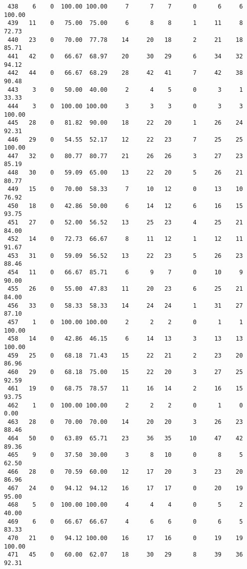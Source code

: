 \begin{verbatim}
 438    6    0  100.00 100.00     7      7    7      0      6     6   100.00
 439   11    0   75.00  75.00     6      8    8      1     11     8    72.73
 440   23    0   70.00  77.78    14     20   18      2     21    18    85.71
 441   42    0   66.67  68.97    20     30   29      6     34    32    94.12
 442   44    0   66.67  68.29    28     42   41      7     42    38    90.48
 443    3    0   50.00  40.00     2      4    5      0      3     1    33.33
 444    3    0  100.00 100.00     3      3    3      0      3     3   100.00
 445   28    0   81.82  90.00    18     22   20      1     26    24    92.31
 446   29    0   54.55  52.17    12     22   23      7     25    25   100.00
 447   32    0   80.77  80.77    21     26   26      3     27    23    85.19
 448   30    0   59.09  65.00    13     22   20      5     26    21    80.77
 449   15    0   70.00  58.33     7     10   12      0     13    10    76.92
 450   18    0   42.86  50.00     6     14   12      6     16    15    93.75
 451   27    0   52.00  56.52    13     25   23      4     25    21    84.00
 452   14    0   72.73  66.67     8     11   12      1     12    11    91.67
 453   31    0   59.09  56.52    13     22   23      5     26    23    88.46
 454   11    0   66.67  85.71     6      9    7      0     10     9    90.00
 455   26    0   55.00  47.83    11     20   23      6     25    21    84.00
 456   33    0   58.33  58.33    14     24   24      1     31    27    87.10
 457    1    0  100.00 100.00     2      2    2      0      1     1   100.00
 458   14    0   42.86  46.15     6     14   13      3     13    13   100.00
 459   25    0   68.18  71.43    15     22   21      2     23    20    86.96
 460   29    0   68.18  75.00    15     22   20      3     27    25    92.59
 461   19    0   68.75  78.57    11     16   14      2     16    15    93.75
 462    1    0  100.00 100.00     2      2    2      0      1     0     0.00
 463   28    0   70.00  70.00    14     20   20      3     26    23    88.46
 464   50    0   63.89  65.71    23     36   35     10     47    42    89.36
 465    9    0   37.50  30.00     3      8   10      0      8     5    62.50
 466   28    0   70.59  60.00    12     17   20      3     23    20    86.96
 467   24    0   94.12  94.12    16     17   17      0     20    19    95.00
 468    5    0  100.00 100.00     4      4    4      0      5     2    40.00
 469    6    0   66.67  66.67     4      6    6      0      6     5    83.33
 470   21    0   94.12 100.00    16     17   16      0     19    19   100.00
 471   45    0   60.00  62.07    18     30   29      8     39    36    92.31

\end{verbatim}
